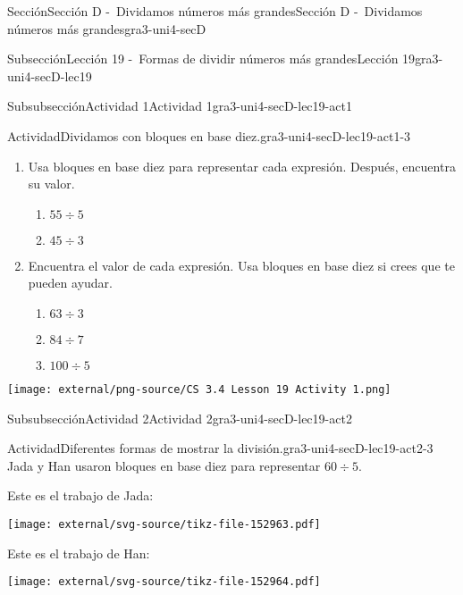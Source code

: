 \documentclass[twoside,14pt,]{extarticle}
\begin{document}
\begin{sectionptx}{Sección}{Sección D -~Dividamos números más grandes}{}{Sección D -~Dividamos números más grandes}{}{}{gra3-uni4-secD}
\begin{subsectionptx}{Subsección}{Lección 19 -~Formas de dividir números más grandes}{}{Lección 19}{}{}{gra3-uni4-secD-lec19}
\begin{subsubsectionptx}{Subsubsección}{Actividad 1}{}{Actividad 1}{}{}{gra3-uni4-secD-lec19-act1}
\begin{activity}{Actividad}{Dividamos con bloques en base diez.}{gra3-uni4-secD-lec19-act1-3}
\begin{sidebyside}{2}{0}{0.1}{0}
\begin{sbspanel}{0.7}%
%
\begin{enumerate}
\item{}Usa bloques en base diez para representar cada expresión. Después, encuentra su valor.%
%
\begin{enumerate}
\item{}\(\displaystyle 55 \div 5\)%
\item{}\(\displaystyle 45 \div 3\)%
\end{enumerate}
\item{}Encuentra el valor de cada expresión. Usa bloques en base diez si crees que te pueden ayudar.%
%
\begin{enumerate}
\item{}\(\displaystyle 63 \div 3\)%
\item{}\(\displaystyle 84 \div 7\)%
\item{}\(\displaystyle 100 \div 5\)%
\end{enumerate}
\end{enumerate}
\end{sbspanel}%
\begin{sbspanel}{0.2}%
\texttt{[image: external/png-source/CS 3.4 Lesson 19 Activity 1.png]}
\end{sbspanel}%
\end{sidebyside}%
\end{activity}%
\end{subsubsectionptx}
%
%
\typeout{************************************************}
\typeout{************************************************}
%
\begin{subsubsectionptx}{Subsubsección}{Actividad 2}{}{Actividad 2}{}{}{gra3-uni4-secD-lec19-act2}
\begin{activity}{Actividad}{Diferentes formas de mostrar la división.}{gra3-uni4-secD-lec19-act2-3}%
Jada y Han usaron bloques en base diez para representar \(60 \div 5\).%
\par
Este es el trabajo de Jada:%
\begin{image}{0}{1}{0}{}%
\texttt{[image: external/svg-source/tikz-file-152963.pdf]}
\end{image}%
Este es el trabajo de Han:%
\begin{image}{0}{1}{0}{}%
\texttt{[image: external/svg-source/tikz-file-152964.pdf]}
\end{image}%
%
\begin{enumerate}

\end{enumerate}
\end{activity}
\end{subsubsectionptx}
\end{subsectionptx}
\end{sectionptx}
\end{document}
